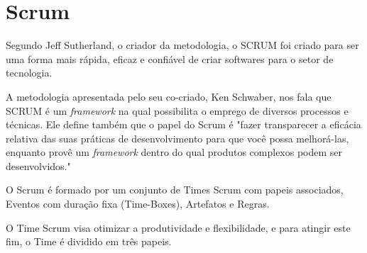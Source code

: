 \begin{table}[h!]
\end{table}
\pagebreak
\section{Scrum}
\label{sec:scrum}

Segundo Jeff Sutherland, o criador da metodologia, o SCRUM foi criado para ser uma forma mais rápida, eficaz e confiável de criar softwares para o setor de tecnologia. \cite{jeff}

A metodologia apresentada pelo seu co-criado, Ken Schwaber, nos fala que SCRUM é um \textit{framework} na qual possibilita o emprego de diversos processos e técnicas. Ele define também que o papel do Scrum é "fazer
transparecer a eficácia relativa das suas práticas de desenvolvimento para que você possa melhorá-las, enquanto provê um \textit{framework} dentro do qual produtos complexos podem ser desenvolvidos." \cite{Kenn}

O Scrum é formado por um conjunto de Times Scrum com papeis associados, Eventos com duração fixa (Time-Boxes), Artefatos e Regras.

O Time Scrum visa otimizar a produtividade e flexibilidade, e para atingir este fim, o Time é dividido em três papeis.


